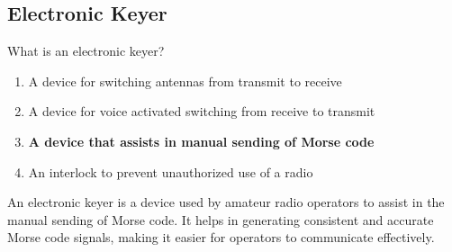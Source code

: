 \subsection{Electronic Keyer}\label{T4A12}

\begin{tcolorbox}[colback=gray!10!white,colframe=black!75!black,title=T4A12]
What is an electronic keyer?
\begin{enumerate}[noitemsep]
    \item A device for switching antennas from transmit to receive
    \item A device for voice activated switching from receive to transmit
    \item \textbf{A device that assists in manual sending of Morse code}
    \item An interlock to prevent unauthorized use of a radio
\end{enumerate}
\end{tcolorbox}

An electronic keyer is a device used by amateur radio operators to assist in the manual sending of Morse code. It helps in generating consistent and accurate Morse code signals, making it easier for operators to communicate effectively.